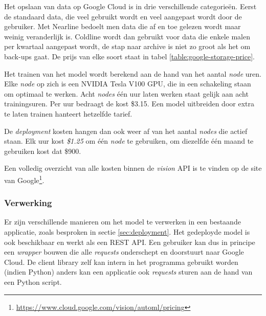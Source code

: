 Het opslaan van data op Google Cloud is in drie verschillende categorieën. Eerst de standaard data, die veel gebruikt wordt en veel aangepast wordt door de gebruiker. Met Nearline bedoelt men data die af en toe gelezen wordt maar weinig veranderlijk is. Coldline wordt dan gebruikt voor data die enkele malen per kwartaal aangepast wordt, de stap naar archive is niet zo groot als het om back-ups gaat. De prijs van elke soort staat in tabel \ref{table:google-storage-price}.

Het trainen van het model wordt berekend aan de hand van het aantal \textit{node} uren. Elke \textit{node} op zich is een NVIDIA Tesla V100 GPU, die in een schakeling staan om optimaal te werken. Acht \textit{nodes} één uur laten werken staat gelijk aan acht trainingsuren. Per uur bedraagt de kost \$3.15. Een model uitbreiden door extra te laten trainen hanteert hetzelfde tarief.

De \textit{deployment} kosten hangen dan ook weer af van het aantal \textit{nodes} die actief staan. Elk uur kost \textit{\$1.25} om één \textit{node} te gebruiken, om diezelfde één maand te gebruiken kost dat \$900.

Een volledig overzicht van alle kosten binnen de \textit{vision} API is te vinden op de site van Google\footnote{\url{https://www.cloud.google.com/vision/automl/pricing}}.

\subsubsection{Verwerking}
\label{sucsubsec:google-nfr-verwerking}

Er zijn verschillende manieren om het model te verwerken in een bestaande applicatie, zoals besproken in sectie \ref{sec:deployment}. Het gedeployde model is ook beschikbaar en werkt als een REST API. Een gebruiker kan dus in principe een \textit{wrapper} bouwen die alle \textit{requests} onderschept en doorstuurt naar Google Cloud. De client library zelf kan intern in het programma gebruikt worden (indien Python) anders kan een applicatie ook \textit{requests} sturen aan de hand van een Python script. 